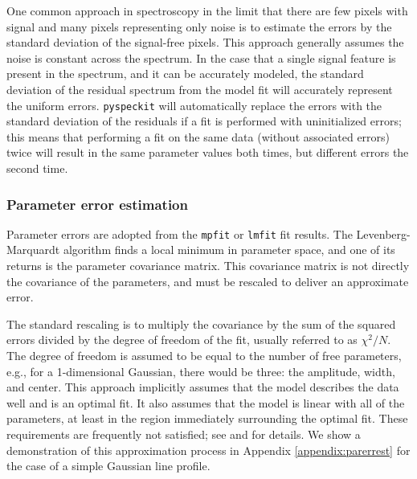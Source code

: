 \documentclass[twocolumn]{aastex62}
\newcommand{\pyspeckit}{\texttt{pyspeckit}\xspace}
\begin{document}
One common approach in spectroscopy in the limit that there are few pixels with
signal and many pixels representing only noise is to estimate the errors by the
standard deviation of the signal-free pixels.  This approach generally assumes
the noise is constant across the spectrum.  In the case that a single signal
feature is present in the spectrum, and it can be accurately modeled, the
standard deviation of the residual spectrum from the model fit will accurately
represent the uniform errors.  \pyspeckit will automatically replace the errors
with the standard deviation of the residuals if a fit is performed with
uninitialized errors; this means that performing a fit on the same data
(without associated errors) twice will result in the same parameter values both
times, but different errors the second time.


\subsubsection{Parameter error estimation}
\label{sec:parerrest}
Parameter errors are adopted from the \texttt{mpfit} or \texttt{lmfit} fit
results.  The Levenberg-Marquardt algorithm finds a local minimum in parameter
space, and one of its returns is the parameter covariance matrix.  This
covariance matrix is not directly the covariance of the parameters, and must be
rescaled to deliver an approximate error.

The standard rescaling is to multiply the covariance by the sum of the squared
errors divided by the degree of freedom of the fit, usually referred to
as $\chi^2/N$.  The degree of freedom is assumed to be equal to the number
of free parameters, e.g., for a 1-dimensional Gaussian, there would be three:
the amplitude, width, and center.  This approach implicitly assumes that the
model describes the data well and is an optimal fit.  It also assumes that
the model is linear with all of the parameters, at least in the region immediately
surrounding the optimal fit.  These requirements are frequently not satisfied;
see \citet{Andrae2010a} and \citet{Andrae2010b} for details.
We show a demonstration of this approximation process in Appendix \ref{appendix:parerrest}
for the case of a simple Gaussian line profile.


\end{document}
